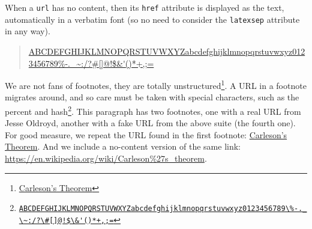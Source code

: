 \documentclass[10pt,]{article}
\theoremstyle{plain}
\theoremstyle{definition}
\theoremstyle{definition}
\theoremstyle{definition}
\theoremstyle{definition}
\theoremstyle{definition}
\theoremstyle{definition}
\numberwithin{equation}{section}
\begin{document}
%
\par
\hypertarget{p-227}{}%
When a \lstinline?url? has no content, then its \lstinline?href? attribute is displayed as the text, automatically in a verbatim font (so no need to consider the \lstinline?latexsep? attribute in any way).%
\begin{quote}\hypertarget{blockquote-2}{}
\hypertarget{p-228}{}%
\url{ABCDEFGHIJKLMNOPQRSTUVWXYZabcdefghijklmnopqrstuvwxyz0123456789\%-._\~:/?\#[]@!$\&'()*+,;=}%
\end{quote}
\hypertarget{p-229}{}%
We are not fans of footnotes, they are totally unstructured\footnote{\href{https://en.wikipedia.org/wiki/Carleson\%27s_theorem}{Carleson's Theorem}\label{fn-3}}.  A URL in a footnote migrates around, and so care must be taken with special characters, such as the percent and hash\footnote{\href{ABCDEFGHIJKLMNOPQRSTUVWXYZabcdefghijklmnopqrstuvwxyz0123456789\%-._\~:/?\#[]@!$\&'()*+,;=}{\lstinline|ABCDEFGHIJKLMNOPQRSTUVWXYZabcdefghijklmnopqrstuvwxyz0123456789\%-._\~:/?\#[]@!$\&'()*+,;=|}\label{fn-4}}.  This paragraph has two footnotes, one with a real URL from Jesse Oldroyd, another with a fake URL from the above suite (the fourth one).  For good measure, we repeat the URL found in the first footnote: \href{https://en.wikipedia.org/wiki/Carleson\%27s_theorem}{Carleson's Theorem}.  And we include a no-content version of the same link:  \url{https://en.wikipedia.org/wiki/Carleson\%27s_theorem}.%
\typeout{************************************************}
\typeout{************************************************}
\end{document}
